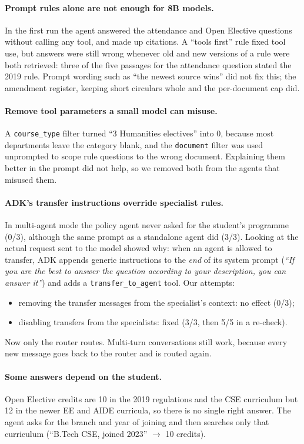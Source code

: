 \documentclass[10pt,a4paper]{article}
\newcommand{\code}[1]{\texttt{\small #1}}
\begin{document}
\paragraph{Prompt rules alone are not enough for 8B models.}
In the first run the agent answered the attendance and Open Elective questions without calling any tool, and
made up citations. A ``tools first'' rule fixed tool use, but answers were still wrong whenever old and new
versions of a rule were both retrieved: three of the five passages for the attendance question stated the 2019
rule. Prompt wording such as ``the newest source wins'' did not fix this; the amendment register, keeping short
circulars whole and the per-document cap did.

\paragraph{Remove tool parameters a small model can misuse.}
A \code{course\_type} filter turned ``3 Humanities electives'' into 0, because most departments leave the
category blank, and the \code{document} filter was used unprompted to scope rule questions to the wrong document.
Explaining them better in the prompt did not help, so we removed both from the agents that misused them.

\paragraph{ADK's transfer instructions override specialist rules.}
In multi-agent mode the policy agent never asked for the student's programme (0/3), although the same prompt as
a standalone agent did (3/3). Looking at the actual request sent to the model showed why: when an agent is allowed
to transfer, ADK appends generic instructions to the \emph{end} of its system prompt (\emph{``If you are the best to
answer the question according to your description, you can answer it''}) and adds a \code{transfer\_to\_agent} tool.
Our attempts:
\begin{itemize}
\item removing the transfer messages from the specialist's context: no effect (0/3);
\item disabling transfers from the specialists: fixed (3/3, then 5/5 in a re-check).
\end{itemize}
Now only the router routes. Multi-turn conversations still work, because every new message goes back to the
router and is routed again.

\paragraph{Some answers depend on the student.}
Open Elective credits are 10 in the 2019 regulations and the CSE curriculum but 12 in the newer EE and AIDE
curricula, so there is no single right answer. The agent asks for the branch and year of joining and then searches
only that curriculum (``B.Tech CSE, joined 2023'' $\rightarrow$ 10 credits).
\end{document}
